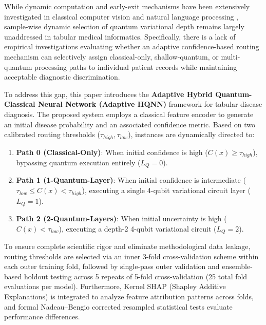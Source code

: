 \documentclass[conference]{IEEEtran}
\begin{document}
While dynamic computation and early-exit mechanisms have been extensively investigated in classical computer vision and natural language processing \cite{teerapittayanon2016branchynet, huang2018multi, han2021dynamic, xin2024early}, sample-wise dynamic selection of quantum variational depth remains largely unaddressed in tabular medical informatics. Specifically, there is a lack of empirical investigations evaluating whether an adaptive confidence-based routing mechanism can selectively assign classical-only, shallow-quantum, or multi-quantum processing paths to individual patient records while maintaining acceptable diagnostic discrimination.

To address this gap, this paper introduces the \textbf{Adaptive Hybrid Quantum-Classical Neural Network (Adaptive HQNN)} framework for tabular disease diagnosis. The proposed system employs a classical feature encoder to generate an initial disease probability and an associated confidence metric. Based on two calibrated routing thresholds ($\tau_{high}, \tau_{low}$), instances are dynamically directed to:
\begin{enumerate}
    \item \textbf{Path 0 (Classical-Only)}: When initial confidence is high ($C(x) \ge \tau_{high}$), bypassing quantum execution entirely ($L_Q = 0$).
    \item \textbf{Path 1 (1-Quantum-Layer)}: When initial confidence is intermediate ($\tau_{low} \le C(x) < \tau_{high}$), executing a single 4-qubit variational circuit layer ($L_Q = 1$).
    \item \textbf{Path 2 (2-Quantum-Layers)}: When initial uncertainty is high ($C(x) < \tau_{low}$), executing a depth-2 4-qubit variational circuit ($L_Q = 2$).
\end{enumerate}

To ensure complete scientific rigor and eliminate methodological data leakage, routing thresholds are selected via an inner 3-fold cross-validation scheme within each outer training fold, followed by single-pass outer validation and ensemble-based holdout testing across 5 repeats of 5-fold cross-validation (25 total fold evaluations per model). Furthermore, Kernel SHAP (Shapley Additive Explanations) \cite{lundberg2017unified, ribeiro2016why} is integrated to analyze feature attribution patterns across folds, and formal Nadeau--Bengio corrected resampled statistical tests \cite{nadeau2003inference} evaluate performance differences.
\end{document}
